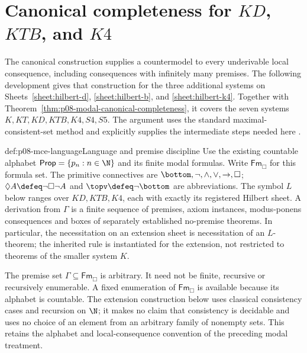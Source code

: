 \section{Canonical completeness for \(KD\), \(KTB\), and \(K4\)}
\label{sec:p08-modal-canonical-extensions}

The canonical construction supplies a countermodel to every underivable
local consequence, including consequences with infinitely many premises.
The following development gives that construction for the three additional
systems on Sheets~\ref{sheet:hilbert-d}, \ref{sheet:hilbert-b}, and
\ref{sheet:hilbert-k4}. Together with
Theorem~\ref{thm:p08-modal-canonical-completeness}, it covers the seven
systems \(K,KT,KD,KTB,K4,S4,S5\). The argument uses the standard
maximal-consistent-set method and explicitly supplies the intermediate
steps needed here \cite[\S2.6, \S4.5, \S\S5.3--5.4]{Chellas1980}.

\begin{hbconvention}{def:p08-mce-language}{Language and premise discipline}
Use the existing countable alphabet
\(\mathsf{Prop}=\{p_n:n\in\N\}\) and its finite modal formulas. Write
\(\mathsf{Fm}_{\Box}\) for this formula set. The primitive connectives
are \(\bottom,\neg,\land,\lor,\to,\Box\);
\(\Diamond A\defeq\neg\Box\neg A\) and
\(\topv\defeq\neg\bottom\) are abbreviations.
The symbol \(L\) below ranges over \(KD,KTB,K4\), each with exactly
its registered Hilbert sheet. A derivation from \(\Gamma\) is a finite
sequence of premises, axiom instances, modus-ponens consequences and boxes
of separately established no-premise theorems. In particular, the
necessitation on an extension sheet is necessitation of an \(L\)-theorem;
the inherited rule is instantiated for the extension, not restricted to
theorems of the smaller system \(K\).

The premise set \(\Gamma\subseteq\mathsf{Fm}_{\Box}\) is arbitrary.
It need not be finite, recursive or recursively enumerable. A fixed
enumeration of \(\mathsf{Fm}_{\Box}\) is available because its alphabet
is countable. The extension construction below uses classical consistency
cases and recursion on \(\N\); it makes no claim that consistency is
decidable and uses no choice of an element from an arbitrary family of
nonempty sets. This retains the alphabet and local-consequence convention
of the preceding modal treatment.
\end{hbconvention}

